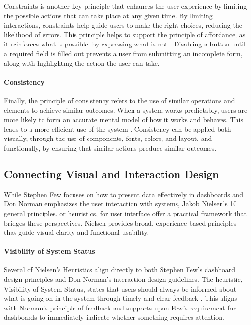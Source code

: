 Constraints is another key principle that enhances the user experience by limiting the possible actions that can take place at any given time. By limiting interactions, constraints help guide users to make the right choices, reducing the likelihood of errors. This principle helps to support the principle of affordance, as it reinforces what is possible, by expressing what is not \autocite[p. 28-29]{sharp-2019}. Disabling a button until a required field is filled out prevents a user from submitting an incomplete form, along with highlighting the action the user can take.

\paragraph{Consistency}
\label{par:consistency}


Finally, the principle of consistency refers to the use of similar operations and elements to achieve similar outcomes. When a system works predictably, users are more likely to form an accurate mental model of how it works and behaves. This leads to a more efficient use of the system \autocite[p. 29]{sharp-2019}. Consistency can be applied both visually, through the use of components, fonts, colors, and layout, and functionally, by ensuring that similar actions produce similar outcomes. 


\subsection{Connecting Visual and Interaction Design}
\label{subsubsec:connecting_visual_and_interaction_design}


While Stephen Few focuses on how to present data effectively in dashboards and Don Norman emphasizes the user interaction with systems, Jakob Nielsen's 10 general principles, or heuristics, for user interface offer a practical framework that bridges these perspectives.  Nielsen provides broad, experience-based principles that guide visual clarity and functional usability.

\paragraph{Visibility of System Status}
\label{par:visibility_system_status}


Several of Nielsen's Heuristics align directly to both Stephen Few's dashboard design principles and Don Norman's interaction design guidelines. The heuristic, Visibility of System Status, states that users should always be informed about what is going on in the system through timely and clear feedback \autocite{Nielsen1994}. This aligns with Norman's principle of feedback and supports upon Few's requirement for dashboards to immediately indicate whether something requires attention.

